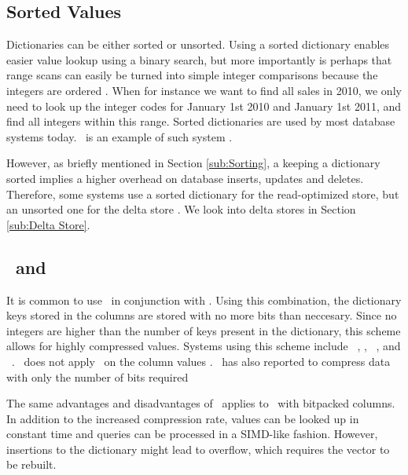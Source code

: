 \subsection{Sorted Values}
\label{sub:Sorted Values}
Dictionaries can be either sorted or unsorted. Using a sorted dictionary enables easier value lookup using a binary search, but more importantly is perhaps that range scans can easily be turned into simple integer comparisons because the integers are ordered \cite{Faust2015-ke}. When for instance we want to find all sales in 2010, we only need to look up the integer codes for January 1st 2010 and January 1st 2011, and find all integers within this range. Sorted dictionaries are used by most database systems today. \saph~is an example of such system \cite{Farber2012-vh}.

However, as briefly mentioned in Section \ref{sub:Sorting}, a keeping a dictionary sorted implies a higher overhead on database inserts, updates and deletes. Therefore, some systems use a sorted dictionary for the read-optimized store, but an unsorted one for the delta store \cite{Plattner2014-fr}.  We look into delta stores in Section \ref{sub:Delta Store}.

\subsection{\de~and \bp}
\label{sub:Dictionary Encoding and Bitpacking}
It is common to use \de~in conjunction with \bp. Using this combination, the dictionary keys stored in the columns are stored with no more bits than neccesary. Since no integers are higher than the number of keys present in the dictionary, this scheme allows for highly compressed values. Systems using this scheme include \ibm~\cite{Raman2013-em}, \blink \cite{Barber2012-xt}, \sapnw~\cite{Willhalm2009-hu}, and \saph~\cite{Psaroudakis2014-ma}. \mssql~does not apply \bp~on the column values \cite{Larson2013-mc}. \qlikview~has also reported to compress data with only the number of bits required \cite{Qlik2014-vd}

The same advantages and disadvantages of \bp~applies to \de~with bitpacked columns. In addition to the increased compression rate, values can be looked up in constant time and queries can be processed in a SIMD-like fashion. However, insertions to the dictionary might lead to overflow, which requires the vector to be rebuilt.


